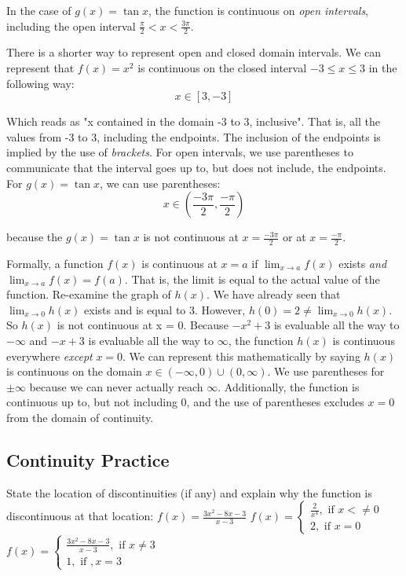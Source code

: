 In the case of $g(x) = \tan{x}$, the function is continuous on \textit{open 
intervals}, including the open interval $\frac{\pi}{2} < x < \frac{3\pi}{2}$.

There is a shorter way to represent open and closed domain intervals. We can 
represent that $f(x) = x^2$ is continuous on the closed interval $-3 \leq x \leq 3$ 
in the following way: $$x \in \left[3, -3 \right]$$

Which reads as "x contained in the domain -3 to 3, inclusive". That is, all the 
values from -3 to 3, including the endpoints. The inclusion of the endpoints is 
implied by the use of \textit{brackets}. For open intervals, we use parentheses to 
communicate that the interval goes up to, but does not include, the endpoints. For 
$g(x) = \tan{x}$, we can use parentheses: $$x \in \left(\frac{-3\pi}{2}, \frac{-\pi}{2}\right)$$

because the $g(x) = \tan{x}$ is not continuous at $x=\frac{-3\pi}{2}$ or at 
$x=\frac{-\pi}{2}$.



Formally, a function $f(x)$ is continuous at $x=a$ if $\lim_{x\to a}f(x)$ exists 
\textit{and} $\lim_{x\to a}f(x) = f(a)$. That is, the limit is equal to the actual 
value of the function. Re-examine the graph of $h(x)$. We have already seen that $
\lim_{x\to 0}h(x)$ exists and is equal to 3. However, $h(0) = 2 \neq \lim_{x\to0}
h(x)$. So $h(x)$ is not continuous at x = 0. Because $-x^2+3$ is evaluable all the 
way to $-\infty$ and $-x+3$ is evaluable all the way to $\infty$, the function 
$h(x)$ is continuous everywhere \textit{except} $x=0$. We can represent this 
mathematically by saying $h(x)$ is continuous on the domain $x \in \left(-\infty, 
0\right)\cup \left(0, \infty\right)$. We use parentheses for $\pm\infty$ because we 
can never actually reach $\infty$. Additionally, the function is continuous up to, 
but not including $0$, and the use of parentheses excludes $x=0$ from the domain of 
continuity.

\subsection{Continuity Practice}
\begin{Exercise}[title=Limits Practice 5, label=limits5]
State the location of discontinuities (if any) and explain why the function is 
discontinuous at that location:
    \Question $f(x) = \frac{3x^2-8x-3}{x-3}$
    \Question $f(x) = \begin{cases}
    \frac{2}{x^4}, \text{ if } x <\neq 0\\
    2, \text{ if } x=0
    \end{cases}$
    \Question $f(x) = \begin{cases}
        \frac{3x^2-8x-3}{x-3}, \text{ if } x \neq 3\\
        1, \text{ if }, x=3
    \end{cases}$
\end{Exercise}


